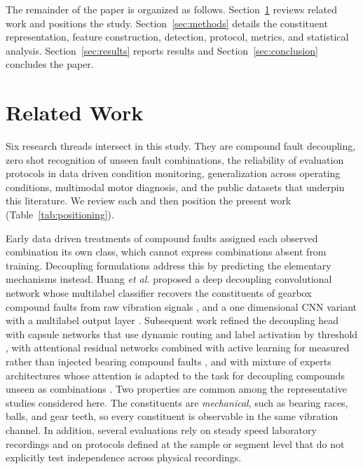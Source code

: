 \documentclass{ieeeaccess}
\begin{document}
The remainder of the paper is organized as follows.
Section~\ref{sec:related} reviews related work and positions the study.
Section~\ref{sec:methods} details the constituent representation, feature
construction, detection, protocol, metrics, and statistical analysis.
Section~\ref{sec:results} reports results and Section~\ref{sec:conclusion}
concludes the paper.

\section{Related Work}
\label{sec:related}

Six research threads intersect in this study. They are compound fault
decoupling, zero shot recognition of unseen fault combinations, the
reliability of evaluation protocols in data driven condition monitoring,
generalization across operating conditions, multimodal motor diagnosis, and
the public datasets that underpin this literature. We review each and then
position the present work (Table~\ref{tab:positioning}).

Early data driven treatments of compound faults assigned each observed
combination its own class, which cannot express combinations absent from
training. Decoupling formulations address this by predicting the elementary
mechanisms instead. Huang \emph{et al.} proposed a deep decoupling
convolutional network whose multilabel classifier recovers the constituents
of gearbox compound faults from raw vibration signals \cite{huang2019ddcnn},
and a one dimensional CNN variant with a multilabel output layer
\cite{huang2019multilabel}. Subsequent work refined the decoupling head with
capsule networks that use dynamic routing and label activation by threshold
\cite{ltssbow2024}, with attentional residual networks combined with active
learning for measured rather than injected bearing compound faults
\cite{decoupling_attn2020}, and with mixture of experts architectures whose
attention is adapted to the task for decoupling compounds unseen as
combinations \cite{hemtan2024}. Two properties are common among the
representative studies considered here. The constituents are
\emph{mechanical}, such as bearing races, balls, and gear teeth, so every
constituent is observable in the same vibration channel. In addition, several
evaluations rely on steady speed laboratory recordings and on protocols
defined at the sample or segment level that do not explicitly test
independence across physical recordings.
\end{document}
